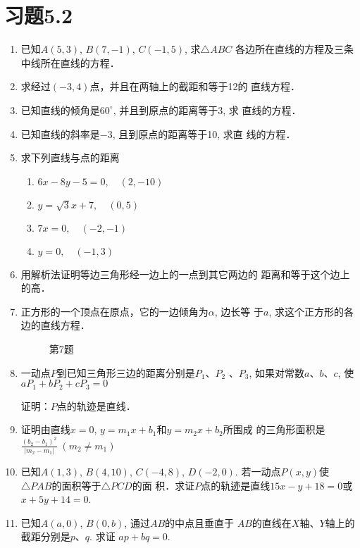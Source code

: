 \section*{习题5.2}

\begin{enumerate}
    \item 已知$A(5,3)$, $B(7,-1)$, $C(-1,5)$, 求$\triangle ABC$
    各边所在直线的方程及三条中线所在直线的方程．
    \item 求经过$(-3,4)$点，并且在两轴上的截距和等于12的
    直线方程．
    \item 已知直线的倾角是$60^{\circ}$, 并且到原点的距离等于3, 求
    直线的方程．
    \item 已知直线的斜率是$-3$, 且到原点的距离等于10, 求直
    线的方程．
    \item 求下列直线与点的距离
\begin{multicols}{2}
\begin{enumerate}
    \item $6x-8y-5=0,\quad (2,-10)$
    \item $y=\sqrt{3}x+7,\quad (0,5)$
    \item $7x=0,\quad (-2,-1)$
    \item $y=0,\quad (-1,3)$
\end{enumerate}
\end{multicols}

\item 用解析法证明等边三角形经一边上的一点到其它两边的
距离和等于这个边上的高．
\item 正方形的一个顶点在原点，它的一边倾角为$\alpha$, 边长等
于$a$, 求这个正方形的各边的直线方程．
\begin{figure}[htp]
    \centering
{}
    \caption*{第7题}
\end{figure}

\item 一动点$P$到已知三角形三边的距离分别是$P_1$、$P_2$
、$P_3$, 
如果对常数$a$、$b$、$c$, 使
$aP_1+bP_2+cP_3=0$

证明：$P$点的轨迹是直线．
\item 证明由直线$x=0$, $y=m_1x+b_1$和$y=m_2x+b_2$所围成
的三角形面积是
$\frac{(b_2-b_1)^2}{|m_2-m_1|}\; (m_2\ne m_1)$
\item 已知$A(1,3)$, $B(4,10)$, $C(-4,8)$, $D(-2,0)$. 
若一动点$P(x,y)$使$\triangle PAB$的面积等于$\triangle PCD$的面
积．求证$P$点的轨迹是直线$15x-y+18=0$或$x+5y+
14=0$.
\item 已知$A(a,0)$, $B(0,b)$, 通过$AB$的中点且垂直于
$AB$的直线在$X$轴、$Y$轴上的截距分别是$p$、$q$. 求证
$ap+bq=0$.
\end{enumerate}

